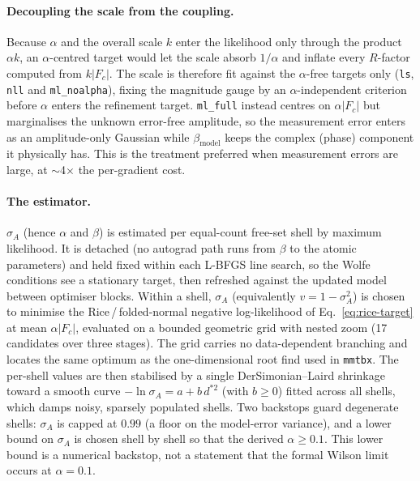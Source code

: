 \documentclass{iucrjournals}
\begin{document}
\paragraph{Decoupling the scale from the coupling.}
Because $\alpha$ and the overall scale $k$ enter the likelihood only through the
product $\alpha k$, an $\alpha$-centred target would let the scale absorb
$1/\alpha$ and inflate every $R$-factor computed from $k|F_{c}|$.  The scale is
therefore fit against the $\alpha$-free targets only (\texttt{ls}, \texttt{nll} and
\texttt{ml\_noalpha}), fixing the magnitude gauge by an $\alpha$-independent
criterion before $\alpha$ enters the refinement target.  \texttt{ml\_full}
instead centres on $\alpha|F_{c}|$ but marginalises the unknown error-free
amplitude, so the measurement error enters as an amplitude-only Gaussian while
$\beta_\mathrm{model}$ keeps the complex (phase) component it physically has. This
is the treatment preferred when measurement errors are large, at $\sim$4$\times$
the per-gradient cost.

\paragraph{The estimator.}
$\sigma_{A}$ (hence $\alpha$ and $\beta$) is estimated per equal-count free-set
shell by maximum likelihood.  It is detached (no autograd path runs from $\beta$
to the atomic parameters) and held fixed within each L-BFGS line search, so the
Wolfe conditions see a stationary target, then refreshed against the updated model
between optimiser blocks.  Within a shell, $\sigma_{A}$ (equivalently
$v = 1 - \sigma_{A}^{2}$) is chosen to minimise the Rice\,/\,folded-normal negative
log-likelihood of Eq.~\ref{eq:rice-target} at mean $\alpha|F_{c}|$, evaluated on a
bounded geometric grid with nested zoom (17 candidates over three stages).  The
grid carries no data-dependent branching and locates the same optimum as the
one-dimensional root find used in \texttt{mmtbx}.  The per-shell values are then
stabilised by a single DerSimonian--Laird shrinkage toward a smooth curve
$-\ln\sigma_{A} = a + b\,d^{\ast 2}$ (with $b \ge 0$) fitted across all shells, which
damps noisy, sparsely populated shells.  Two backstops guard degenerate shells:
$\sigma_{A}$ is capped at $0.99$ (a floor on the model-error variance), and a
lower bound on $\sigma_A$ is chosen shell by shell so that the derived
$\alpha\geq0.1$. This lower bound is a numerical backstop, not a statement that
the formal Wilson limit occurs at $\alpha=0.1$.
\end{document}
